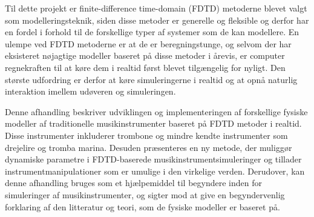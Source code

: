 Til dette projekt er finite-difference time-domain (FDTD) metoderne blevet valgt som modelleringsteknik, siden disse metoder er generelle og fleksible og derfor har en fordel i forhold til de forskellige typer af systemer som de kan modellere.  En ulempe ved FDTD metoderne er at de er beregningstunge, og selvom der har eksisteret n{\o}jagtige modeller baseret p{\aa} disse metoder i {\aa}revis, er computer regnekraften til at k{\o}re dem i realtid f{\o}rst blevet tilg{\ae}ngelig for nyligt. Den st{\o}rste udfordring er derfor at k{\o}re simuleringerne i realtid og at opn{\aa} naturlig interaktion imellem ud{\o}veren og simuleringen. 

Denne afhandling beskriver udviklingen og implementeringen af forskellige fysiske modeller af traditionelle musikinstrumenter baseret p{\aa} FDTD metoder i realtid. Disse instrumenter inkluderer trombone og mindre kendte instrumenter som drejelire og tromba marina. Desuden pr{\ae}senteres en ny metode, der muligg{\o}r dynamiske parametre i FDTD-baserede musikinstrumentsimuleringer og tillader instrumentmanipulationer som er umulige i den virkelige verden. 
Derudover, kan denne afhandling bruges som et hj{\ae}lpemiddel til begyndere inden for simuleringer af musikinstrumenter, og sigter mod at give en begyndervenlig forklaring af den litteratur og teori, som de fysiske modeller er baseret p{\aa}. 
